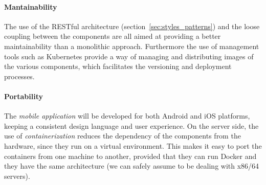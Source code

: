 \paragraph{Mantainability}
The use of the RESTful architecture (section~\ref{sec:styles_patterns}) and the
loose coupling between the components are all aimed at providing a better
maintainability than a monolithic approach.
Furthermore the use of management tools such as Kubernetes provide a way of
managing and distributing images of the various components, which facilitates
the versioning and deployment processes.

\paragraph{Portability}
The \emph{mobile application} will be developed for both Android and iOS
platforms, keeping a consistent design language and user experience.
On the server side, the use of \emph{containerization} reduces the dependency
of the components from the hardware, since they run on a virtual environment.
This makes it easy to port the containers from one machine to another, provided
that they can run Docker and they have the same architecture (we can safely
assume to be dealing with x86/64 servers).